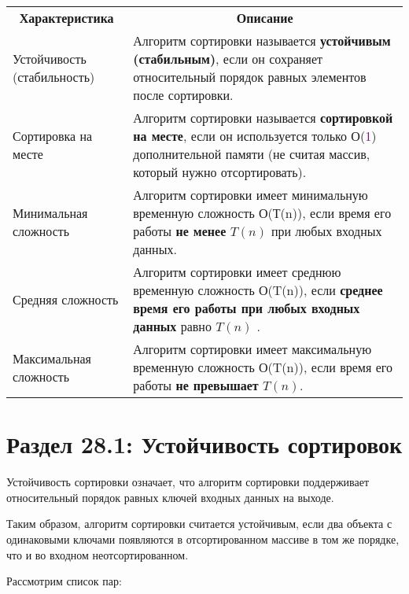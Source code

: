 \begin{tabular}{p{4cm}p{12cm}}
\multicolumn{1}{c}{\textbf{Характеристика}}& \multicolumn{1}{c}{\textbf{Описание}} \\[5pt]

\ttfamily Устойчивость (стабильность) & Алгоритм сортировки называется \textbf{устойчивым (стабильным)}, если он сохраняет относительный порядок равных элементов после сортировки.\\[5pt]

\ttfamily Сортировка на месте & Алгоритм сортировки называется \textbf{сортировкой на месте}, если он используется только О(\textcolor{Purple}{1}) дополнительной памяти (не считая массив, который нужно отсортировать).\\[5pt]

\ttfamily Минимальная сложность &  Алгоритм сортировки имеет минимальную временную сложность О(Т(n)), если время его работы \textbf{не менее} $T(n)$ при любых входных данных. \\[5pt]

\ttfamily Средняя сложность & Алгоритм сортировки имеет среднюю временную сложность О(T(n)), если \textbf{среднее время его работы при любых входных данных} равно $T(n)$ .\\[5pt]

\ttfamily Максимальная сложность & Алгоритм сортировки имеет максимальную временную сложность О(T(n)), если время его работы \textbf{не превышает} $T(n)$.\\[5pt]

\end{tabular}

\section*{Раздел 28.1: Устойчивость сортировок}

Устойчивость сортировки означает, что алгоритм сортировки поддерживает относительный порядок равных ключей входных данных на выходе.

\vspace{\baselineskip}

Таким образом, алгоритм сортировки считается устойчивым, если два объекта с одинаковыми ключами появляются в отсортированном массиве в том же порядке, что и во входном неотсортированном.

\vspace{\baselineskip}

Рассмотрим список пар:

